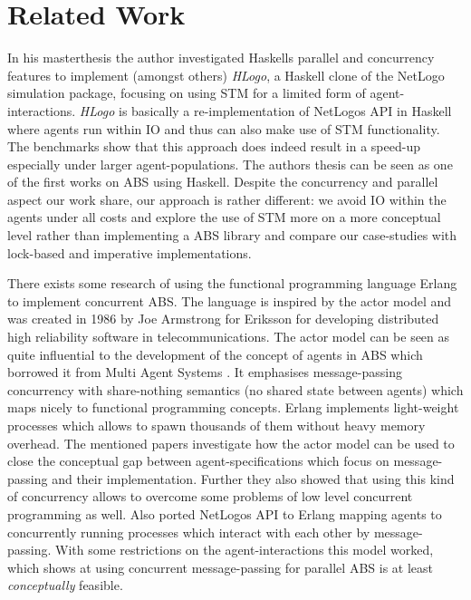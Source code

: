 \section{Related Work}
\label{sec:rel_work}

In his masterthesis \cite{bezirgiannis_improving_2013} the author investigated Haskells parallel and concurrency features to implement (amongst others) \textit{HLogo}, a Haskell clone of the NetLogo simulation package, focusing on using STM for a limited form of agent-interactions. \textit{HLogo} is basically a re-implementation of NetLogos API in Haskell where agents run within IO and thus can also make use of STM functionality. The benchmarks show that this approach does indeed result in a speed-up especially under larger agent-populations. The authors thesis can be seen as one of the first works on ABS using Haskell. Despite the concurrency and parallel aspect our work share, our approach is rather different: we avoid IO within the agents under all costs and explore the use of STM more on a more conceptual level rather than implementing a ABS library and compare our case-studies with lock-based and imperative implementations.

There exists some research \cite{di_stefano_using_2005, varela_modelling_2004, sher_agent-based_2013} of using the functional programming language Erlang \cite{armstrong_erlang_2010} to implement concurrent ABS. The language is inspired by the actor model \cite{agha_actors:_1986} and was created in 1986 by Joe Armstrong for Eriksson for developing distributed high reliability software in telecommunications. The actor model can be seen as quite influential to the development of the concept of agents in ABS which borrowed it from Multi Agent Systems \cite{wooldridge_introduction_2009}. It emphasises message-passing concurrency with share-nothing semantics (no shared state between agents) which maps nicely to functional programming concepts. Erlang implements light-weight processes which allows to spawn thousands of them without heavy memory overhead. The mentioned papers investigate how the actor model can be used to close the conceptual gap between agent-specifications which focus on message-passing and their implementation. Further they also showed that using this kind of concurrency allows to overcome some problems of low level concurrent programming as well.
Also \cite{bezirgiannis_improving_2013} ported NetLogos API to Erlang mapping agents to concurrently running processes which interact with each other by message-passing. With some restrictions on the agent-interactions this model worked, which shows at using concurrent message-passing for parallel ABS is at least \textit{conceptually} feasible.

